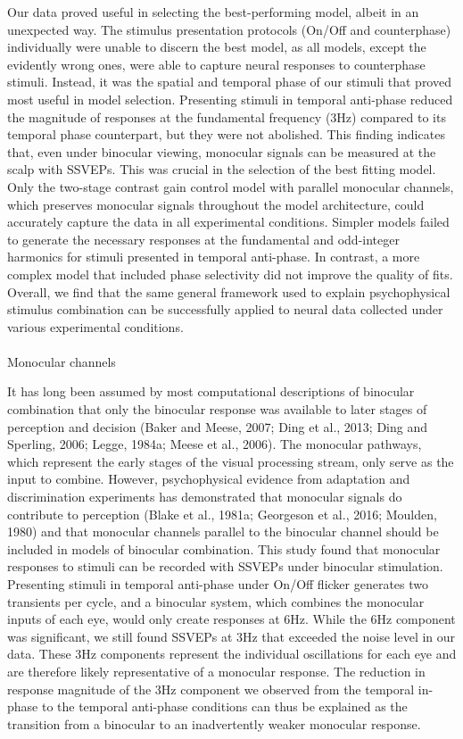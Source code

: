 \documentclass[review,
  12pt,
]{elsarticle}
\makeatletter
\let\oldparagraph\paragraph
\renewcommand{\paragraph}{
    \@ifstar
      \xxxParagraphStar
      \xxxParagraphNoStar
  }
\newcommand{\xxxParagraphStar}[1]{\oldparagraph*{#1}\mbox{}}
\newcommand{\xxxParagraphNoStar}[1]{\oldparagraph{#1}\mbox{}}
\makeatother
\begin{document}
Our data proved useful in selecting the best-performing model, albeit in
an unexpected way. The stimulus presentation protocols (On/Off and
counterphase) individually were unable to discern the best model, as all
models, except the evidently wrong ones, were able to capture neural
responses to counterphase stimuli. Instead, it was the spatial and
temporal phase of our stimuli that proved most useful in model
selection. Presenting stimuli in temporal anti-phase reduced the
magnitude of responses at the fundamental frequency (3Hz) compared to
its temporal phase counterpart, but they were not abolished. This
finding indicates that, even under binocular viewing, monocular signals
can be measured at the scalp with SSVEPs. This was crucial in the
selection of the best fitting model. Only the two-stage contrast gain
control model with parallel monocular channels, which preserves
monocular signals throughout the model architecture, could accurately
capture the data in all experimental conditions. Simpler models failed
to generate the necessary responses at the fundamental and odd-integer
harmonics for stimuli presented in temporal anti-phase. In contrast, a
more complex model that included phase selectivity did not improve the
quality of fits. Overall, we find that the same general framework used
to explain psychophysical stimulus combination can be successfully
applied to neural data collected under various experimental conditions.

\paragraph{Monocular channels}\label{monocular-channels}

It has long been assumed by most computational descriptions of binocular
combination that only the binocular response was available to later
stages of perception and decision (Baker and Meese, 2007; Ding et al.,
2013; Ding and Sperling, 2006; Legge, 1984a; Meese et al., 2006). The
monocular pathways, which represent the early stages of the visual
processing stream, only serve as the input to combine. However,
psychophysical evidence from adaptation and discrimination experiments
has demonstrated that monocular signals do contribute to perception
(Blake et al., 1981a; Georgeson et al., 2016; Moulden, 1980) and that
monocular channels parallel to the binocular channel should be included
in models of binocular combination. This study found that monocular
responses to stimuli can be recorded with SSVEPs under binocular
stimulation. Presenting stimuli in temporal anti-phase under On/Off
flicker generates two transients per cycle, and a binocular system,
which combines the monocular inputs of each eye, would only create
responses at 6Hz. While the 6Hz component was significant, we still
found SSVEPs at 3Hz that exceeded the noise level in our data. These 3Hz
components represent the individual oscillations for each eye and are
therefore likely representative of a monocular response. The reduction
in response magnitude of the 3Hz component we observed from the temporal
in-phase to the temporal anti-phase conditions can thus be explained as
the transition from a binocular to an inadvertently weaker monocular
response.
\end{document}
